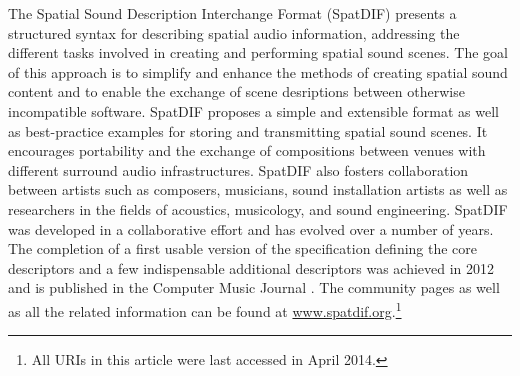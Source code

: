 \documentclass{article}
\begin{document}
The Spatial Sound Description Interchange Format (SpatDIF) presents a structured syntax for describing spatial audio information, addressing the different tasks involved in creating and performing spatial sound scenes.
The goal of this approach is to simplify and enhance the methods of creating spatial sound content and to enable the exchange of scene desriptions between otherwise incompatible software. 
SpatDIF proposes a simple and extensible format as well as best-practice examples for storing and transmitting spatial sound scenes. 
It encourages portability and the exchange of compositions between venues with different surround audio infrastructures. 
SpatDIF also fosters collaboration between artists such as composers, musicians, sound installation artists as well as researchers in the fields of acoustics, musicology, and sound engineering.
SpatDIF was developed in a collaborative effort and has evolved over a number of years.
The completion of a first usable version of the specification \cite{SpatDIF_03} defining the core descriptors and a few indispensable additional descriptors was achieved in 2012 and is published in the Computer Music Journal \cite{Peters:2013SpatDifCMJ}.
The community pages as well as all the related information can be found at \href{http://www.spatdif.org}{www.spatdif.org}.\footnote{All URIs in this article were last accessed in April 2014.}
\end{document}
